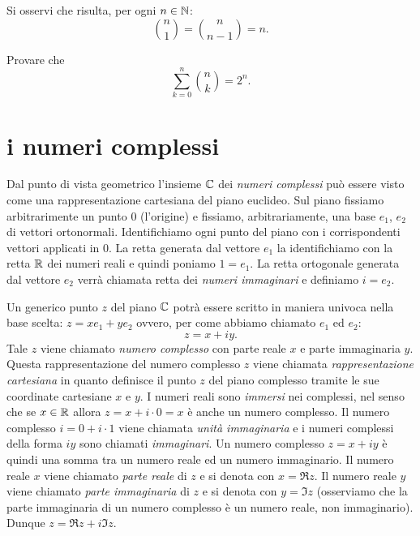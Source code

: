 Si osservi che risulta, per ogni $n\in {\mathbb N}$:
\[
  {n \choose 1} = {n \choose n-1} = n.
\]
  
\begin{exercise}
  Provare che
  \[
   \sum_{k=0}^n {n \choose k} = 2^n.
  \]
\end{exercise}  



\section{i numeri complessi}
%
%
%
\label{sec:complessi}

Dal punto di vista geometrico l'insieme $\CC$ dei \emph{numeri complessi}%
%
\index{$\CC$}
può essere visto come una rappresentazione cartesiana 
del piano euclideo.
Sul piano fissiamo arbitrarimente un punto $0$ (l'origine) 
e fissiamo, arbitrariamente, una base $e_1$, $e_2$ di vettori ortonormali.
Identifichiamo ogni punto del piano con i corrispondenti vettori
applicati in $0$. La retta generata dal vettore $e_1$ la identifichiamo
con la retta ${\mathbb R}$ dei numeri reali e quindi poniamo $1=e_1$.
La retta ortogonale generata dal vettore $e_2$ verrà chiamata
retta dei \emph{numeri immaginari} e definiamo $i=e_2$.

Un generico punto $z$ del piano $\CC$ potrà essere scritto in
maniera univoca nella base scelta: $z = x e_1 + y e_2$ ovvero,
per come abbiamo chiamato $e_1$ ed $e_2$:
\[
z = x + i y.
\]
Tale $z$ viene chiamato
\emph{numero complesso} con parte reale $x$ e parte immaginaria $y$.
Questa rappresentazione del numero complesso $z$ viene
chiamata \emph{rappresentazione cartesiana}%
%
 in quanto definisce
il punto $z$ del piano complesso tramite le sue coordinate cartesiane
$x$ e $y$.
I numeri reali sono \emph{immersi} nei complessi, nel senso che se
$x\in {\mathbb R}$ allora $z= x + i\cdot 0 = x$ è anche un numero complesso.
Il numero complesso $i = 0 + i\cdot 1$ viene chiamata \emph{unità immaginaria}%
%
e i numeri complessi della forma $iy$ sono chiamati \emph{immaginari}.
Un numero
complesso $z = x+iy$ è quindi una somma tra un numero reale ed un numero
immaginario. Il numero reale $x$ viene chiamato \emph{parte reale}
di $z$ e
si denota con $x=\Re z$.
%
Il numero reale $y$ viene chiamato
\emph{parte immaginaria}
di $z$ e si denota con $y=\Im z$
%
(osserviamo che la parte immaginaria di un numero complesso è un numero
reale, non immaginario). Dunque $z= \Re z + i \Im z$.

